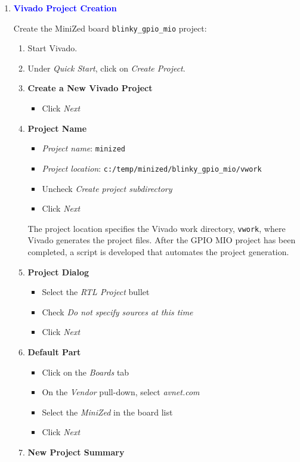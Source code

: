 \begin{enumerate}
\item \textcolor{blue}{\textbf{Vivado Project Creation}}

Create the MiniZed board \verb+blinky_gpio_mio+ project:
%
\begin{enumerate}
\item Start Vivado.
\item Under \emph{Quick Start}, click on \emph{Create Project}.
\item {\bf Create a New Vivado Project}
%
\begin{itemize}
\item Click \emph{Next}
\end{itemize}
%
\item {\bf Project Name}
%
\begin{itemize}
\item \emph{Project name}: \verb+minized+
\item \emph{Project location}: \verb+c:/temp/minized/blinky_gpio_mio/vwork+
\item Uncheck \emph{Create project subdirectory}
\item Click \emph{Next}
\end{itemize}
%
The project location specifies the Vivado work directory, \verb+vwork+,
where Vivado generates the project files. After the GPIO MIO project has
been completed, a script is developed that automates the project generation.
%
\item {\bf Project Dialog}
%
\begin{itemize}
\item Select the \emph{RTL Project} bullet
\item Check \emph{Do not specify sources at this time}
\item Click \emph{Next}
\end{itemize}
%
\item {\bf Default Part}
%
\begin{itemize}
\item Click on the \emph{Boards} tab
\item On the \emph{Vendor} pull-down, select \emph{avnet.com}
\item Select the \emph{MiniZed} in the board list
\item Click \emph{Next}
\end{itemize}
%
\item {\bf New Project Summary}

\end{enumerate}
\end{enumerate}
